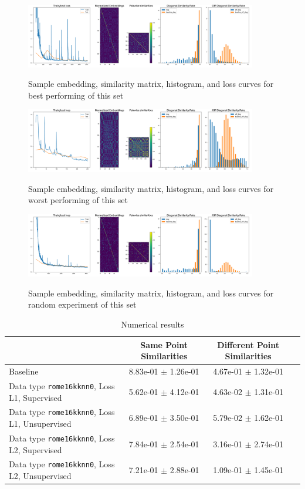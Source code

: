 \documentclass[a4paper]{article}
\begin{document}
\begin{figure}[H]
  \includegraphics[width=0.9\textwidth]{figures/rome16kknn0-loss-l2-unsup-true}
  \label{fig:rome16kknn0-loss-l2-unsup-true-sub1}
  \caption{Sample embedding, similarity matrix, histogram, and loss curves for best performing of this set}
\end{figure}
\begin{figure}[H]
  \includegraphics[width=0.9\textwidth]{figures/rome16kknn0-loss-l2-unsup-false}
  \label{fig:rome16kknn0-loss-l2-unsup-false-sub1}
  \caption{Sample embedding, similarity matrix, histogram, and loss curves for worst performing of this set}
\end{figure}
\begin{figure}[H]
  \includegraphics[width=0.9\textwidth]{figures/rome16kknn0-loss-l1-unsup-true}
  \label{fig:rome16kknn0-loss-l1-unsup-true-sub1}
  \caption{Sample embedding, similarity matrix, histogram, and loss curves for random experiment of this set}
\end{figure}
\begin{table}[H]
  \caption{Numerical results}
      \begin{tabular}{|l|c|c|c|} \hline
                                      &  Same Point Similarities  &  Different Point Similarities  \\ \hline
Baseline   & 8.83e-01 $\pm$ 1.26e-01 & 4.67e-01 $\pm$ 1.32e-01 \\ \hline
Data type \texttt{rome16kknn0}, Loss L1, Supervised   & 5.62e-01 $\pm$ 4.12e-01 & 4.63e-02 $\pm$ 1.31e-01 \\ \hline
Data type \texttt{rome16kknn0}, Loss L1, Unsupervised   & 6.89e-01 $\pm$ 3.50e-01 & 5.79e-02 $\pm$ 1.62e-01 \\ \hline
Data type \texttt{rome16kknn0}, Loss L2, Supervised   & 7.84e-01 $\pm$ 2.54e-01 & 3.16e-01 $\pm$ 2.74e-01 \\ \hline
Data type \texttt{rome16kknn0}, Loss L2, Unsupervised   & 7.21e-01 $\pm$ 2.88e-01 & 1.09e-01 $\pm$ 1.45e-01 \\ \hline
      \end{tabular}
      \label{fig:tab1}
\end{table}
\end{document}
